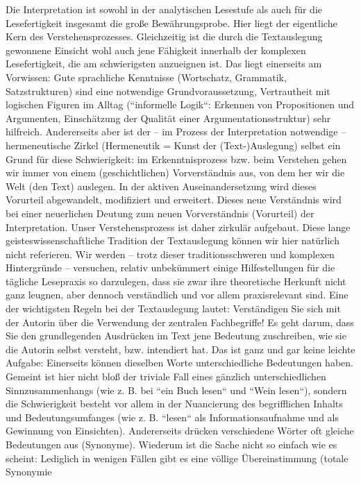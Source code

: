 \documentclass[]{book}
\theoremstyle{definition}
\theoremstyle{definition}
\theoremstyle{definition}
\theoremstyle{remark}
\begin{document}
Die Interpretation ist sowohl in der analytischen Lesestufe als auch für
die Lesefertigkeit insgesamt die große Bewährungsprobe. Hier liegt der
eigentliche Kern des Verstehensprozesses. Gleichzeitig ist die durch die
Textauslegung gewonnene Einsicht wohl auch jene Fähigkeit innerhalb der
komplexen Lesefertigkeit, die am schwierigsten anzueignen ist. Das liegt
einerseits am Vorwissen: Gute sprachliche Kenntnisse (Wortschatz,
Grammatik, Satzstrukturen) sind eine notwendige Grundvoraussetzung,
Vertrautheit mit logischen Figuren im Alltag (``informelle Logik``:
Erkennen von Propositionen und Argumenten, Einschätzung der Qualität
einer Argumentationsstruktur) sehr hilfreich. Andererseits aber ist der
-- im Prozess der Interpretation notwendige -- hermeneutische Zirkel
(Hermeneutik = Kunst der (Text-)Auslegung) selbst ein Grund für diese
Schwierigkeit: im Erkenntnisprozess bzw. beim Verstehen gehen wir immer
von einem (geschichtlichen) Vorverständnis aus, von dem her wir die Welt
(den Text) auslegen. In der aktiven Auseinandersetzung wird dieses
Vorurteil abgewandelt, modifiziert und erweitert. Dieses neue
Verständnis wird bei einer neuerlichen Deutung zum neuen Vorverständnis
(Vorurteil) der Interpretation. Unser Verstehensprozess ist daher
zirkulär aufgebaut. Diese lange geisteswissenschaftliche Tradition der
Textauslegung können wir hier natürlich nicht referieren. Wir werden --
trotz dieser traditionsschweren und komplexen Hintergründe -- versuchen,
relativ unbekümmert einige Hilfestellungen für die tägliche Lesepraxis
so darzulegen, dass sie zwar ihre theoretische Herkunft nicht ganz
leugnen, aber dennoch verständlich und vor allem praxisrelevant sind.
Eine der wichtigsten Regeln bei der Textauslegung lautet: Verständigen
Sie sich mit der Autorin über die Verwendung der zentralen Fachbegriffe!
Es geht darum, dass Sie den grundlegenden Ausdrücken im Text jene
Bedeutung zuschreiben, wie sie die Autorin selbst versteht, bzw.
intendiert hat. Das ist ganz und gar keine leichte Aufgabe: Einerseits
können dieselben Worte unterschiedliche Bedeutungen haben. Gemeint ist
hier nicht bloß der triviale Fall eines gänzlich unterschiedlichen
Sinnzusammenhangs (wie z. B. bei ``ein Buch lesen`` und ``Wein lesen``),
sondern die Schwierigkeit besteht vor allem in der Nuancierung des
begrifflichen Inhalts und Bedeutungsumfanges (wie z. B. ``lesen`` als
Informationsaufnahme und als Gewinnung von Einsichten). Andererseits
drücken verschiedene Wörter oft gleiche Bedeutungen aus (Synonyme).
Wiederum ist die Sache nicht so einfach wie es scheint: Lediglich in
wenigen Fällen gibt es eine völlige Übereinstimmung (totale Synonymie
\end{document}
